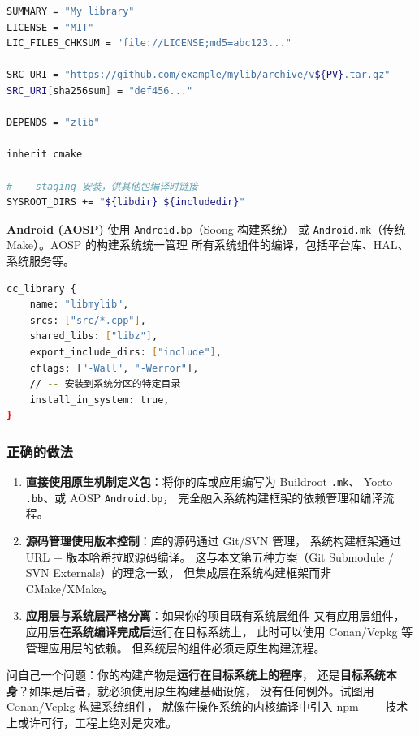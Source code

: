 \documentclass[12pt,a4paper,fontset=fandol]{ctexbook}
\begin{document}
\begin{lstlisting}[language=Bash, caption={Yocto recipe 示例: mylib\_1.0.0.bb}]
SUMMARY = "My library"
LICENSE = "MIT"
LIC_FILES_CHKSUM = "file://LICENSE;md5=abc123..."

SRC_URI = "https://github.com/example/mylib/archive/v${PV}.tar.gz"
SRC_URI[sha256sum] = "def456..."

DEPENDS = "zlib"

inherit cmake

# -- staging 安装，供其他包编译时链接
SYSROOT_DIRS += "${libdir} ${includedir}"
\end{lstlisting}

\textbf{Android (AOSP)} 使用 \texttt{Android.bp}（Soong 构建系统）
或 \texttt{Android.mk}（传统 Make）。AOSP 的构建系统统一管理
所有系统组件的编译，包括平台库、HAL、系统服务等。

\begin{lstlisting}[language=Bash, caption={Android.bp 模块示例}]
cc_library {
    name: "libmylib",
    srcs: ["src/*.cpp"],
    shared_libs: ["libz"],
    export_include_dirs: ["include"],
    cflags: ["-Wall", "-Werror"],
    // -- 安装到系统分区的特定目录
    install_in_system: true,
}
\end{lstlisting}

\subsubsection*{正确的做法}

\begin{enumerate}[nosep]
  \item \textbf{直接使用原生机制定义包}：将你的库或应用编写为 Buildroot \texttt{.mk}、
        Yocto \texttt{.bb}、或 AOSP \texttt{Android.bp}，
        完全融入系统构建框架的依赖管理和编译流程。

  \item \textbf{源码管理使用版本控制}：库的源码通过 Git/SVN 管理，
        系统构建框架通过 URL + 版本哈希拉取源码编译。
        这与本文第五种方案（Git Submodule / SVN Externals）的理念一致，
        但集成层在系统构建框架而非 CMake/XMake。

  \item \textbf{应用层与系统层严格分离}：如果你的项目既有系统层组件
        又有应用层组件，应用层\textbf{在系统编译完成后}运行在目标系统上，
        此时可以使用 Conan/Vcpkg 等管理应用层的依赖。
        但系统层的组件必须走原生构建流程。
\end{enumerate}

\begin{note}[ title={判断标准}]
问自己一个问题：你的构建产物是\textbf{运行在目标系统上的程序}，
还是\textbf{目标系统本身}？如果是后者，就必须使用原生构建基础设施，
没有任何例外。试图用 Conan/Vcpkg 构建系统组件，
就像在操作系统的内核编译中引入 npm——
技术上或许可行，工程上绝对是灾难。
\end{note}
\end{document}
